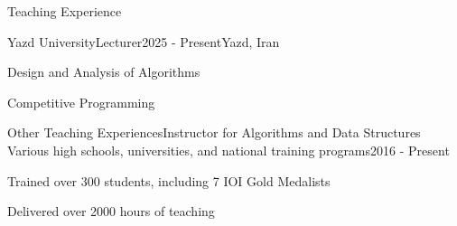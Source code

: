 \begin{section}{Teaching Experience}
  \begin{subsectionnobullet}{Yazd University}{Lecturer}{2025 - Present}{Yazd, Iran}
    \item Design and Analysis of Algorithms
    \item Competitive Programming
  \end{subsectionnobullet}

  \begin{subsectionnobullet}{Other Teaching Experiences}{Instructor for Algorithms and Data Structures\\Various high schools, universities, and national training programs}{2016 - Present}{}
    \item Trained over 300 students, including 7 IOI Gold Medalists
    \item Delivered over 2000 hours of teaching
  \end{subsectionnobullet}

\end{section}
